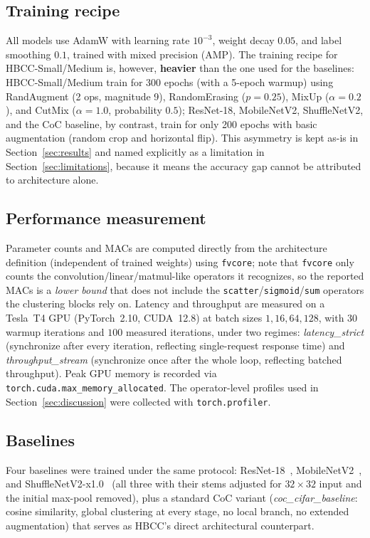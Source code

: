 \documentclass[journal]{IEEEtran}
\begin{document}
\subsection{Training recipe}

All models use AdamW with learning rate $10^{-3}$, weight decay $0.05$, and label smoothing $0.1$, trained with mixed precision (AMP). The training recipe for HBCC-Small/Medium is, however, \textbf{heavier} than the one used for the baselines: HBCC-Small/Medium train for 300 epochs (with a 5-epoch warmup) using RandAugment (2 ops, magnitude 9), RandomErasing ($p=0.25$), MixUp ($\alpha=0.2$), and CutMix ($\alpha=1.0$, probability $0.5$); ResNet-18, MobileNetV2, ShuffleNetV2, and the CoC baseline, by contrast, train for only 200 epochs with basic augmentation (random crop and horizontal flip). This asymmetry is kept as-is in Section~\ref{sec:results} and named explicitly as a limitation in Section~\ref{sec:limitations}, because it means the accuracy gap cannot be attributed to architecture alone.

\subsection{Performance measurement}

Parameter counts and MACs are computed directly from the architecture definition (independent of trained weights) using \texttt{fvcore}; note that \texttt{fvcore} only counts the convolution/linear/matmul-like operators it recognizes, so the reported MACs is a \emph{lower bound} that does not include the \texttt{scatter}/\texttt{sigmoid}/\texttt{sum} operators the clustering blocks rely on. Latency and throughput are measured on a Tesla~T4 GPU (PyTorch~2.10, CUDA~12.8) at batch sizes $1, 16, 64, 128$, with $30$ warmup iterations and $100$ measured iterations, under two regimes: \textit{latency\_strict} (synchronize after every iteration, reflecting single-request response time) and \textit{throughput\_stream} (synchronize once after the whole loop, reflecting batched throughput). Peak GPU memory is recorded via \texttt{torch.cuda.max\_memory\_allocated}. The operator-level profiles used in Section~\ref{sec:discussion} were collected with \texttt{torch.profiler}.

\subsection{Baselines}

Four baselines were trained under the same protocol: ResNet-18~\cite{He2016ResNet}, MobileNetV2~\cite{Sandler2018MobileNetV2}, and ShuffleNetV2-x1.0~\cite{Ma2018ShuffleNetV2} (all three with their stems adjusted for $32\times32$ input and the initial max-pool removed), plus a standard CoC variant (\textit{coc\_cifar\_baseline}: cosine similarity, global clustering at every stage, no local branch, no extended augmentation) that serves as HBCC's direct architectural counterpart.
\end{document}
